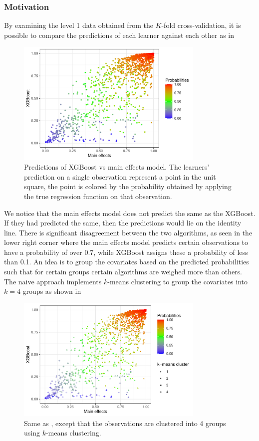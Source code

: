 \documentclass[./main.tex]{subfiles}
\begin{document}
\subsubsection{Motivation}
By examining the level 1 data obtained from the $ K $-fold cross-validation, it is possible to compare the predictions of each learner against each other as in 
\begin{figure}[H]
    \centering
    \includegraphics[width=0.8\textwidth]{figures/esl_preds_xgboost_vs_main.pdf}
    \caption{Predictions of XGBoost vs main effects model. The learners' prediction on a single observation represent a point in the unit square, the point is colored by the probability obtained by applying the true regression function on that observation.}
    \label{fig:esl_preds_xgboost_vs_main}
\end{figure}
We notice that the main effects model does not predict the same as the XGBoost. If they had predicted the same, then the predictions would lie on the identity line. There is significant disagreement between the two algorithms, as seen in the lower right corner where the main effects model predicts certain observations to have a probability of over 0.7, while XGBoost assigns these a probability of less than 0.1. An idea is to group the covariates based on the predicted probabilities such that for certain groups certain algorithms are weighed more than others. The naive approach implements $ k $-means clustering to group the covariates into $ k = 4 $ groups as shown in  
\begin{figure}[H]
    \centering
    \includegraphics[width=0.8\textwidth]{figures/esl_preds_xgboost_vs_main_kmeans.pdf}
\caption{Same as , except that the observations are clustered into 4 groups using $ k $-means clustering.}
    \label{fig:esl_preds_xgboost_vs_main_kmeans}
\end{figure}
\end{document}
